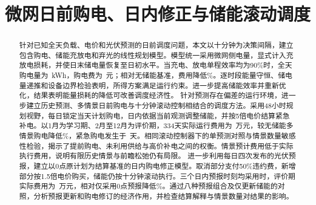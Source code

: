 \documentclass[withoutpreface,notoc]{cumcmthesis}
\title{微网日前购电、日内修正与储能滚动调度}
\begin{document}
\maketitle
\begin{abstract}
针对已知全天负载、电价和光伏预测的日前调度问题，本文以十分钟为决策间隔，建立包含购电、储能充放电和弃光的线性规划模型。模型统一采用微网侧电量，显式计入充放电损耗，并使日末储电量恢复至日初水平。当充电、放电单程效率均为90\%时，全天购电量为\QoneGrid\ kWh，购电费为\QoneCost\ 元；相对无储能基准，费用降低\SavingPercent\%。逐时段能量守恒、储电量递推和设备边界检验表明，所得方案满足运行约束。进一步提高储能效率并重新优化，结果表明能量损耗的降低可改善调度经济性。
针对预测存在偏差的运行环境，进一步建立历史预测、多情景日前购电与十分钟滚动控制相结合的调度方法。采用48小时规划视野，每日锁定当天计划购电，日内依据当前观测调整储能，并按5倍电价结算紧急补电。以1月为学习期、2月至12月为评价期，334天实际运行费用为\QtwoCost\ 万元，较无储能多情景购电降低\QtwoNoStorageSaving\%，紧急购电发生于\QtwoDays\ 天。相同滚动控制器下的单预测对照与情景数量敏感性检验，揭示了提前购电、未利用供给与高价补电之间的权衡。情景预计费用低于实际执行费用，说明有限历史情景与前瞻松弛仍有局限。
进一步利用每日四次发布的光伏预报，建立以0点原计划为结算基准的日内购电修正模型。取消部分支付50\%违约费，新增部分按1.5倍电价购买，储能仍按十分钟滚动执行。三个日内预报时刻均采用时，评价期实际费用为\QthreeCost\ 万元，相对仅采用0点预报降低\QthreeSaving\%。通过八种预报组合及仅更新储能的对照，分析预报更新和购电修订的经济作用，并检查结算解释与情景数量对结果的影响。
\end{abstract}



\end{document}
